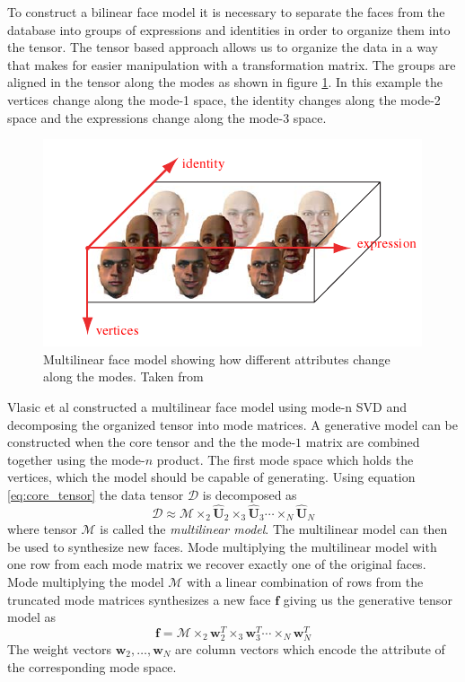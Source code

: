 \documentclass[11pt,a4paper]{report}
\begin{document}
To construct a bilinear face model it is necessary to separate the faces from the
database into groups of expressions and identities in order to organize them
into the tensor. The tensor based approach allows us to organize
the data in a way that makes for easier manipulation with a transformation
matrix. The groups are aligned in the tensor along the modes as shown in figure
\ref{gr:tensor}. In this example the vertices change along the mode-1 space, the identity changes
along the mode-2 space and the expressions change along the mode-3 space. 
\begin{figure}[H]
\centering
\includegraphics[scale=0.8]{images/modes_faces.png}
\caption{Multilinear face model showing how different attributes change along
  the modes. Taken from \cite{faceTransfer05} }
\label{gr:tensor}
\end{figure}


Vlasic et al constructed a multilinear
face model using mode-n SVD and decomposing the organized tensor into mode
matrices. A generative model can be constructed when the core tensor and the the
mode-$1$ matrix are combined together using the mode-$n$ product. The first mode
space which holds the vertices, which the model should be capable of generating. Using equation \ref{eq:core_tensor} the
data tensor $\mathcal{D}$ is decomposed as
\begin{equation} \label{eq:multilin_face}
\mathcal{D} \approx \mathcal{M} \times_2
\hat{\mathbf{U}}_2 \times_3 \hat{\mathbf{U}}_3 \dotsb \times_N \hat{\mathbf{U}}_N
\end{equation}
where tensor $\mathcal{M}$ is called the \textit{multilinear model}. The
multilinear model can then be used to synthesize new faces. Mode multiplying the
multilinear model with one row from
each mode matrix we recover exactly one of the original faces. Mode multiplying
the model $\mathcal{M}$ with a linear combination of rows from the truncated
mode matrices synthesizes a new face $\mathbf{f}$ giving us the generative
tensor model as
\begin{equation} \label{eq:generative_model}
\mathbf{f} = \mathcal{M} \times_2
\mathbf{w}_{2}^T \times_3 \mathbf{w}_3^T \dotsb \times_N \mathbf{w}_N^T
\end{equation}
The weight vectors $\mathbf{w}_{2}, \ldots ,\mathbf{w}_{N}$ are column vectors
which encode the attribute of the corresponding mode space.
\end{document}
